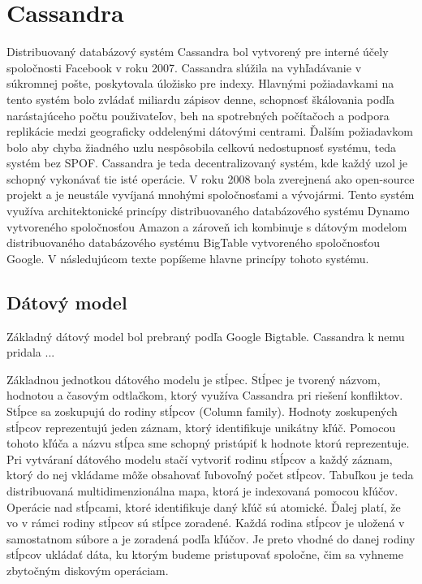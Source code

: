 \documentclass[11pt,twoside,a4paper]{book}
\begin{document}
\section{Cassandra}

Distribuovaný databázový systém Cassandra bol vytvorený pre interné účely spoločnosti Facebook v roku 2007. Cassandra slúžila na vyhľadávanie v súkromnej pošte, poskytovala úložisko pre indexy. Hlavnými požiadavkami na tento systém bolo zvládať miliardu zápisov denne, schopnosť škálovania podľa narástajúceho počtu použivateľov, beh na spotrebných počítačoch a podpora replikácie medzi geograficky oddelenými dátovými centrami. Ďalším požiadavkom bolo aby chyba žiadného uzlu nespôsobila celkovú nedostupnosť systému, teda systém bez SPOF. Cassandra je teda decentralizovaný systém, kde každý uzol je schopný vykonávať tie isté operácie. V roku 2008 bola zverejnená ako open-source projekt a je neustále vyvíjaná mnohými spoločnosťami a vývojármi. Tento systém využíva architektonické princípy distribuovaného databázového systému Dynamo vytvoreného spoločnosťou Amazon a zároveň ich kombinuje s dátovým modelom distribuovaného databázového systému BigTable vytvoreného spoločnosťou Google. V následujúcom texte popíšeme hlavne princípy tohoto systému.

\subsection{Dátový model}

Základný dátový model bol prebraný podľa Google Bigtable. Cassandra k nemu pridala ... 


Základnou jednotkou dátového modelu je stĺpec. Stĺpec je tvorený názvom, hodnotou a časovým odtlačkom, ktorý využíva Cassandra pri riešení konfliktov. Stĺpce sa zoskupujú do rodiny stĺpcov (Column family). Hodnoty zoskupených stĺpcov reprezentujú jeden záznam, ktorý identifikuje unikátny kľúč. Pomocou tohoto kľúča a názvu stĺpca sme schopný pristúpiť k hodnote ktorú reprezentuje. Pri vytváraní dátového modelu stačí vytvoriť rodinu stĺpcov a každý záznam, ktorý do nej vkládame môže obsahovať ľubovoľný počet stĺpcov. Tabuľkou je teda distribuovaná multidimenzionálna mapa, ktorá je indexovaná pomocou kľúčov. Operácie nad stĺpcami, ktoré identifikuje daný kľúč sú atomické. Ďalej platí, že vo v rámci rodiny stĺpcov sú stĺpce zoradené. Každá rodina stĺpcov je uložená v samostatnom súbore a je zoradená podľa kľúčov. Je preto vhodné do danej rodiny stĺpcov ukládať dáta, ku ktorým budeme pristupovať spoločne, čim sa vyhneme zbytočným diskovým operáciam.
\end{document}
